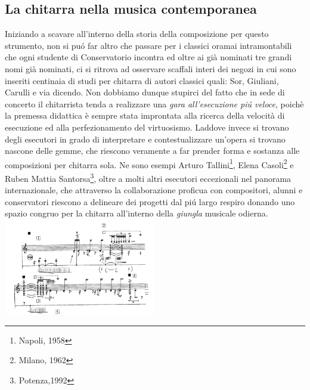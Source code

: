 \documentclass[oneside]{article}
\begin{document}
\begin{multicols*}{2}

\section{ La chitarra nella musica contemporanea}
\noindent

Iniziando a scavare all'interno della storia della composizione per questo strumento, non si puó far altro che passare per i classici oramai intramontabili che ogni studente di Conservatorio incontra ed oltre ai già nominati tre grandi nomi già nominati, ci si ritrova ad osservare scaffali interi dei negozi in cui sono inseriti centinaia di studi per chitarra di autori classici quali: Sor, Giuliani, Carulli e via dicendo. Non dobbiamo dunque stupirci del fatto che in sede di concerto il chitarrista tenda a realizzare una \textit{gara all'esecuzione piú veloce}, poichè la premessa didattica è sempre stata improntata alla ricerca della velocità di esecuzione ed alla perfezionamento del virtuosismo. Laddove invece si trovano degli esecutori in grado di interpretare e contestualizzare un'opera si trovano nascone delle gemme, che riescono veramente a far prender forma e sostanza alle composizioni per chitarra sola. Ne sono esempi Arturo Tallini\footnote{Napoli, 1958},  Elena Casoli\footnote{Milano, 1962} e Ruben Mattia Santorsa\footnote{Potenza,1992}, oltre a molti altri esecutori eccezionali nel panorama internazionale, che attraverso la collaborazione proficua con compositori, alunni e conservatori riescono a delineare dei progetti dal piú largo respiro donando uno spazio congruo per la chitarra all'interno della \textit{giungla} musicale odierna.
\includegraphics[width=0.5\textwidth]{img/ektopos.png}

\end{multicols*}
\end{document}
